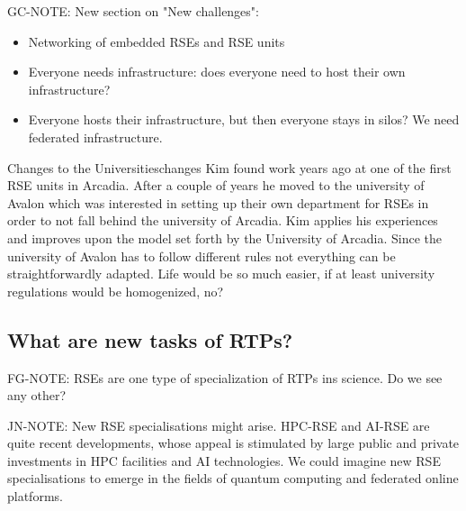 \documentclass{eceasst}
\begin{document}
\begin{FramedParagraphWithFootnotes}
  GC-NOTE: New section on "New challenges":

  \begin{itemize}
    \item Networking of embedded RSEs and RSE units
    \item Everyone needs infrastructure: does everyone need to host their own infrastructure?
    \item Everyone hosts their infrastructure, but then everyone stays in silos? We need federated infrastructure.
  \end{itemize}
\end{FramedParagraphWithFootnotes}

\begin{story}{Changes to the Universities}{changes}
Kim found work years ago at one of the first RSE units in Arcadia. After a couple of years he moved to the university of
Avalon which was interested in setting up their own department for RSEs in order to not fall behind the university of Arcadia.
Kim applies his experiences and improves upon the model set forth by the University of Arcadia. Since the university
of Avalon has to follow different rules not everything can be straightforwardly adapted. Life would be so much easier,
if at least university regulations would be homogenized, no?
\end{story}

\subsection{What are new tasks of RTPs?}
 FG-NOTE: RSEs are one type of specialization of RTPs ins science. Do we see any other?
\begin{FramedParagraphWithFootnotes}
JN-NOTE:
New RSE specialisations might arise.
HPC-RSE and AI-RSE are quite recent developments,
whose appeal is stimulated by large public and private
investments in HPC facilities and AI technologies.
We could imagine new RSE specialisations to emerge in the fields
of quantum computing and federated online platforms.
\end{FramedParagraphWithFootnotes}
\end{document}
